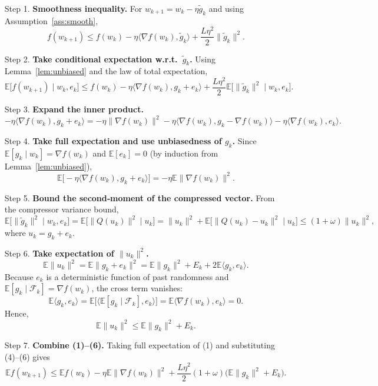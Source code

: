 \documentclass{article}
\newcommand{\E}{\mathbb{E}}
\begin{document}
\begin{enumerate}
\item[Step 1.] \textbf{Smoothness inequality.}  
For $w_{k+1}=w_{k}-\eta\tilde g_{k}$ and using Assumption~\ref{ass:smooth},
\[
f(w_{k+1})\le f(w_{k})-\eta\langle\nabla f(w_{k}),\tilde g_{k}\rangle
+\frac{L\eta^{2}}{2}\|\tilde g_{k}\|^{2}. \tag{1}
\]

\item[Step 2.] \textbf{Take conditional expectation w.r.t.\ $\tilde g_{k}$.}  
Using Lemma~\ref{lem:unbiased} and the law of total expectation,
\[
\E\big[f(w_{k+1})\mid w_{k},e_{k}\big]
\le f(w_{k})-\eta\langle\nabla f(w_{k}),g_{k}+e_{k}\rangle
+\frac{L\eta^{2}}{2}\E\big[\|\tilde g_{k}\|^{2}\mid w_{k},e_{k}\big]. \tag{2}
\]

\item[Step 3.] \textbf{Expand the inner product.}  
\[
-\eta\langle\nabla f(w_{k}),g_{k}+e_{k}\rangle
=-\eta\|\nabla f(w_{k})\|^{2}
-\eta\langle\nabla f(w_{k}),g_{k}-\nabla f(w_{k})\rangle
-\eta\langle\nabla f(w_{k}),e_{k}\rangle. \tag{3}
\]

\item[Step 4.] \textbf{Take full expectation and use unbiasedness of $g_{k}$.}  
Since $\E[g_{k}\mid w_{k}]=\nabla f(w_{k})$ and $\E[e_{k}]=0$ (by induction from Lemma~\ref{lem:unbiased}),
\[
\E\big[-\eta\langle\nabla f(w_{k}),g_{k}+e_{k}\rangle\big]
= -\eta\E\|\nabla f(w_{k})\|^{2}. \tag{4}
\]

\item[Step 5.] \textbf{Bound the second‑moment of the compressed vector.}  
From the compressor variance bound,
\[
\E\big[\|\tilde g_{k}\|^{2}\mid w_{k},e_{k}\big]
 =\E\big[\|Q(u_{k})\|^{2}\mid u_{k}\big]
 =\|u_{k}\|^{2}+\E\big[\|Q(u_{k})-u_{k}\|^{2}\mid u_{k}\big]
 \le (1+\omega)\|u_{k}\|^{2},\tag{5}
\]
where $u_{k}=g_{k}+e_{k}$.

\item[Step 6.] \textbf{Take expectation of $\|u_{k}\|^{2}$.}  
\[
\E\|u_{k}\|^{2}
 =\E\|g_{k}+e_{k}\|^{2}
 =\E\|g_{k}\|^{2}+E_{k}+2\E\langle g_{k},e_{k}\rangle.
\]
Because $e_{k}$ is a deterministic function of past randomness and $\E[g_{k}\mid\mathcal F_{k}]=\nabla f(w_{k})$, the cross term vanishes:
\[
\E\langle g_{k},e_{k}\rangle
 =\E\big[\langle\E[g_{k}\mid\mathcal F_{k}],e_{k}\rangle\big]
 =\E\langle\nabla f(w_{k}),e_{k}\rangle =0.
\]
Hence,
\[
\E\|u_{k}\|^{2}\le \E\|g_{k}\|^{2}+E_{k}. \tag{6}
\]

\item[Step 7.] \textbf{Combine (1)–(6).}  
Taking full expectation of (1) and substituting (4)–(6) gives
\[
\E f(w_{k+1})\le \E f(w_{k})
-\eta\E\|\nabla f(w_{k})\|^{2}
+\frac{L\eta^{2}}{2}(1+\omega)\big(\E\|g_{k}\|^{2}+E_{k}\big). \tag{7}
\]


\end{enumerate}
\end{document}
